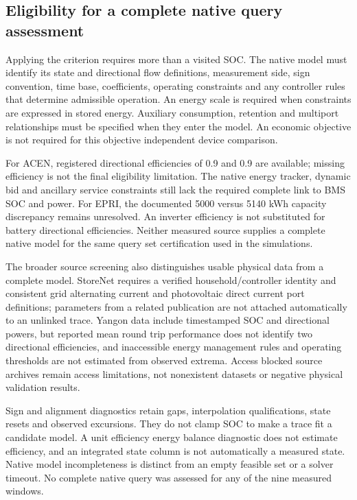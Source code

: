 \subsection{Eligibility for a complete native query assessment}
Applying the criterion requires more than a visited SOC. The native model
must identify its state and directional flow definitions, measurement side,
sign convention, time base, coefficients, operating constraints and any
controller rules that determine admissible operation. An energy scale is
required when constraints are expressed in stored energy. Auxiliary
consumption, retention and multiport relationships must be specified when
they enter the model. An economic objective is not required for this
objective independent device comparison.

For ACEN, registered directional efficiencies of 0.9 and 0.9 are available;
missing efficiency is not the final eligibility limitation. The native
energy tracker, dynamic bid and ancillary service constraints still lack
the required complete link to BMS SOC and power. For EPRI, the documented
5000 versus 5140 kWh capacity discrepancy remains unresolved. An inverter
efficiency is not substituted for battery directional efficiencies.
Neither measured source supplies a complete native model for the same
query set certification used in the simulations.

The broader source screening also distinguishes usable physical data from
a complete model. StoreNet requires a verified household/controller identity
and consistent grid alternating current and photovoltaic direct current
port definitions; parameters from a related publication are not attached
automatically to an unlinked trace. Yangon data include timestamped SOC
and directional powers, but reported mean round trip performance does not
identify two directional efficiencies, and inaccessible energy management
rules and operating thresholds are not estimated from observed extrema.
Access blocked source archives remain access limitations, not nonexistent
datasets or negative physical validation results.

Sign and alignment diagnostics retain gaps, interpolation qualifications,
state resets and observed excursions. They do not clamp SOC to make a trace
fit a candidate model. A unit efficiency energy balance diagnostic does not
estimate efficiency, and an integrated state column is not automatically
a measured state. Native model incompleteness is distinct from an empty
feasible set or a solver timeout. No complete native query was assessed
for any of the nine measured windows.


